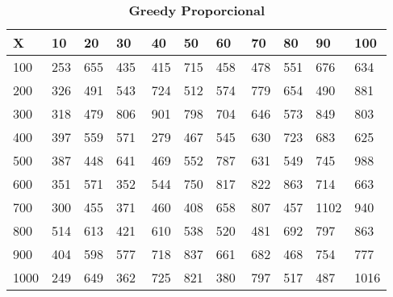 \documentclass[10pt,letterpaper]{article}
\begin{document}
\begin{center}
\begin{table}\renewcommand{\arraystretch}{2.5}
\caption{\large \textbf{Greedy Proporcional}}
\centering
\begin{tabular} { |m{0.5cm}|m{1.3cm}|m{1.3cm}|m{1.3cm}|m{1.3cm}|m{1.3cm}|m{1.3cm}|m{1.3cm}|m{1.3cm}|m{1.3cm}|m{1.3cm}|} 
\hline
\rowcolor{Gray}
\centering \textbf{X} & \centering \textbf{10} & \centering \textbf{20} & \centering \textbf{30}\ & \centering \textbf{40} & \centering \textbf{50} & \centering \textbf{60}\ & \centering \textbf{70} & \centering \textbf{80} & \centering \textbf{90}\ & \textbf{100} \\\hline
\cellcolor{Gray}100 & \Large 253 & \Large 655 & \Large 435 & \Large 415 & \Large 715 & \Large 458 & \Large 478 & \Large 551 & \Large 676 & \Large 634 \\
\hline
\cellcolor{Gray}200 & \Large 326 & \Large 491 & \Large 543 & \Large 724 & \Large 512 & \Large 574 & \Large 779 & \Large 654 & \Large 490 & \Large 881 \\
\hline
\cellcolor{Gray}300 & \Large 318 & \Large 479 & \Large 806 & \Large 901 & \Large 798 & \Large 704 & \Large 646 & \Large 573 & \Large 849 & \Large 803 \\
\hline
\cellcolor{Gray}400 & \Large 397 & \Large 559 & \Large 571 & \Large 279 & \Large 467 & \Large 545 & \Large 630 & \Large 723 & \Large 683 & \Large 625 \\
\hline
\cellcolor{Gray}500 & \Large 387 & \Large 448 & \Large 641 & \Large 469 & \Large 552 & \Large 787 & \Large 631 & \Large 549 & \Large 745 & \Large 988 \\
\hline
\cellcolor{Gray}600 & \Large 351 & \Large 571 & \Large 352 & \Large 544 & \Large 750 & \Large 817 & \Large 822 & \Large 863 & \Large 714 & \Large 663 \\
\hline
\cellcolor{Gray}700 & \Large 300 & \Large 455 & \Large 371 & \Large 460 & \Large 408 & \Large 658 & \Large 807 & \Large 457 & \Large 1102 & \Large 940 \\
\hline
\cellcolor{Gray}800 & \Large 514 & \Large 613 & \Large 421 & \Large 610 & \Large 538 & \Large 520 & \Large 481 & \Large 692 & \Large 797 & \Large 863 \\
\hline
\cellcolor{Gray}900 & \Large 404 & \Large 598 & \Large 577 & \Large 718 & \Large 837 & \Large 661 & \Large 682 & \Large 468 & \Large 754 & \Large 777 \\
\hline
\cellcolor{Gray}1000 & \Large 249 & \Large 649 & \Large 362 & \Large 725 & \Large 821 & \Large 380 & \Large 797 & \Large 517 & \Large 487 & \Large 1016 \\
\hline
\end{tabular} \\
\end{table}
\end{center}
\end{document}
